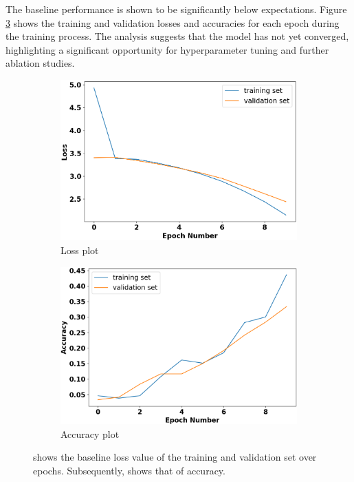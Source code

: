 \documentclass{l4proj}
\begin{document}
The baseline performance is shown to be significantly below expectations. Figure \ref{fig:participant-initial-loss-and-accuracy-plots} shows the training and validation losses and accuracies for each epoch during the training process. The analysis suggests that the model has not yet converged, highlighting a significant opportunity for hyperparameter tuning and further ablation studies.

\begin{figure}[h]
   \centering
   \begin{subfigure}{0.4\textwidth}
        \includegraphics[width=\textwidth]{images/participant-initial-test-loss.png}
        \caption{Loss plot}
        \label{fig:participant-initial-test-loss}
    \end{subfigure}
    \qquad
    \begin{subfigure}{0.4\textwidth}
        \includegraphics[width=\textwidth]{images/participant-initial-test-accuracy.png}
        \caption{Accuracy plot}
        \label{fig:participant-initial-test-accuracy}
    \end{subfigure}
  \caption{ shows the baseline loss value of the training and validation set over epochs. Subsequently,  shows that of accuracy.}
  \label{fig:participant-initial-loss-and-accuracy-plots}
\end{figure}
\end{document}
